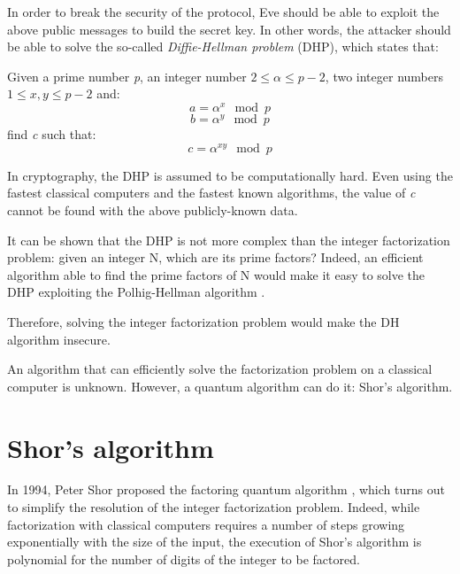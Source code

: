 In order to break the security of the protocol, Eve should be able to exploit the above public messages to build the secret key. In other words, the attacker should be able to solve the so-called \textit{Diffie-Hellman problem} (DHP), which states that:

\begin{proposition}
Given a prime number \textit{p}, an integer number $2 \leq \alpha \leq p-2$, two integer numbers $1 \leq x, y \leq p -2$ and:
\begin{equation*}
    a = \alpha^x \mod{p}
\end{equation*}
\begin{equation*}
    b = \alpha^y \mod{p}
\end{equation*}
find \textit{c} such that:
\begin{equation*}
    c = \alpha^{xy} \mod{p}
\end{equation*}

\end{proposition}

In cryptography, the DHP is assumed to be computationally hard. Even using the fastest classical computers and the fastest known algorithms, the value of \textit{c} cannot be found with the above publicly-known data.

It can be shown that the DHP is not more complex than the integer factorization problem: given an integer N, which are its prime factors? Indeed, an efficient algorithm able to find the prime factors of N would make it easy to solve the DHP exploiting the Polhig-Hellman algorithm \cite{ph}.

Therefore, solving the integer factorization problem would make the DH algorithm insecure.

An algorithm that can efficiently solve the factorization problem on a classical computer is unknown. However, a quantum algorithm can do it: Shor's algorithm.

\section{Shor's algorithm}
In 1994, Peter Shor proposed the factoring quantum algorithm \cite{shor}, which turns out to simplify the resolution of the integer factorization problem. Indeed, while factorization with classical computers requires a number of steps growing exponentially with the size of the input, the execution of Shor's algorithm is polynomial for the number of digits of the integer to be factored.

